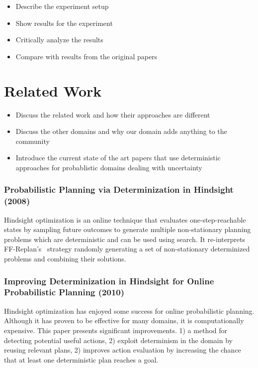 \documentclass[runningheads,a4paper]{llncs}
\begin{document}
\begin{itemize}
	\item Describe the experiment setup
	\item Show results for the experiment
	\item Critically analyze the results
	\item Compare with results from the original papers
\end{itemize}


\section{Related Work}

\begin{itemize}
	\item Discuss the related work and how their approaches are different
	\item Discuss the other domains and why our domain adds anything to the community
	\item Introduce the current state of the art papers that use deterministic approaches for probablistic domains dealing with uncertainty
\end{itemize}

\subsubsection{Probabilistic Planning via Determinization in Hindsight (2008)~\cite{yoon2008probabilistic}}

Hindsight optimization is an online technique that evaluates one-step-reachable
states by sampling future outcomes to generate multiple non-stationary planning
problems which are deterministic and can be used using search. It re-interprets
FF-Replan's~\cite{FFReplan} strategy randomly generating a set of non-stationary
determinized problems and combining their solutions.

\subsubsection{Improving Determinization in Hindsight for Online Probabilistic Planning (2010)~\cite{yoon2010improving}}

Hindsight optimization has enjoyed some success for online probabilistic
planning. Although it has proven to be effective for many domains, it is
computationally expensive. This paper presents significant improvements.  1) a
method for detecting potential useful actions, 2) exploit determinism in the
domain by reusing relevant plans, 2) improves action evaluation by increasing
the chance that at least one deterministic plan reaches a goal.
\end{document}
